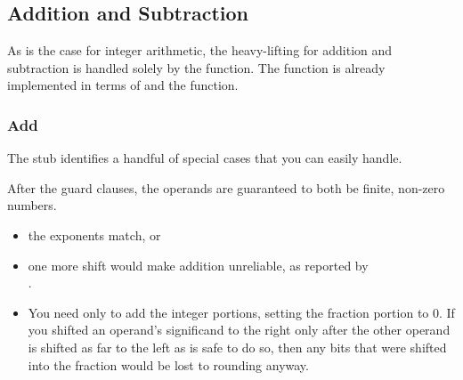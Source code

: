 \subsection{Addition and Subtraction}

As is the case for integer arithmetic, the heavy-lifting for addition and subtraction is handled solely by the  function.
The  function is already implemented in terms of  and the  function.

\subsubsection{Add}

The  stub identifies a handful of special cases that you can easily handle.
\begin{description}
\end{description}

After the guard clauses, the operands are guaranteed to both be finite, non-zero numbers.

\begin{description}
    \begin{itemize}
        \item the exponents match, or
        \item one more shift would make addition unreliable, as reported by \\ .
    \end{itemize}
    \begin{itemize}
        \item You need only to add the integer portions, setting the fraction portion to 0.
        If you shifted an operand's significand to the right only after the other operand is shifted as far to the left as is safe to do so, then any bits that were shifted into the fraction would be lost to rounding anyway.
    \end{itemize}
\end{description}


